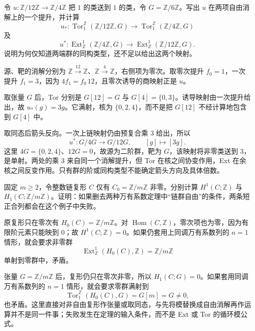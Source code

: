 \BookExercises

\begin{exercise}\label{g2:ex:cyclic-coefficient-maps}
	令 \(u:\mathbb Z/12\mathbb Z\to\mathbb Z/4\mathbb Z\) 把 \(1\) 的类送到 \(1\) 的类，令 \(G=\mathbb Z/6\mathbb Z\)。写出 \(u\) 在两项自由消解上的一个提升，并计算
	\[
		u_*:\operatorname{Tor}^{\mathbb Z}_1(\mathbb Z/12\mathbb Z,G)\longrightarrow\operatorname{Tor}^{\mathbb Z}_1(\mathbb Z/4\mathbb Z,G)
	\]
	及
	\[
		u^*:\operatorname{Ext}_{\mathbb Z}^1(\mathbb Z/4\mathbb Z,G)\longrightarrow\operatorname{Ext}_{\mathbb Z}^1(\mathbb Z/12\mathbb Z,G).
	\]
	说明为何仅知道两端群的同构类型，还不足以给出这两个映射。
\end{exercise}
\begin{solution}
	源、靶的消解分别为 \(\mathbb Z\xrightarrow{12}\mathbb Z\)、\(\mathbb Z\xrightarrow{4}\mathbb Z\)，右侧项为零次。取零次提升 \(f_0=1\)，一次提升 \(f_1=3\)，因为 \(4f_1=f_0\,12\)，且零次诱导的商映射正是 \(u\)。

	取张量 \(G\) 后，Tor 分别是 \(G[12]=G\) 与 \(G[4]=\{0,3\}\)。诱导映射由一次提升给出，故 \(u_*(g)=3g\)。它满射，核为 \(\{0,2,4\}\)，而不是把 \(G[12]\) 不经计算地包含到 \(G[4]\) 中。

	取同态后箭头反向。一次上链映射仍由预复合乘 \(3\) 给出，所以
	\[
		u^*:G/4G\longrightarrow G/12G,\qquad[g]\longmapsto[3g].
	\]
	这里 \(4G=\{0,2,4\}\)、\(12G=0\)，故源为二阶群，靶为 \(G\)，该映射将非零类送到 \(3\)，是单射。两处的乘 \(3\) 来自同一个消解提升，但 Tor 在核之间协变作用，Ext 在余核之间反变作用。只有群的阶或同构类型不能确定箭头方向及具体倍数。
\end{solution}

\begin{exercise}\label{g2:ex:uct-needs-free-chains}
	固定 \(m\ge2\)，令整数链复形 \(C\) 仅有 \(C_0=\mathbb Z/m\mathbb Z\) 非零。分别计算 \(H^1(C;\mathbb Z)\) 与 \(H_1(C;\mathbb Z/m\mathbb Z)\)。证明：如果删去两种万有系数定理中“链群自由”的条件，两条短正合列都会在这个例子中失败。
\end{exercise}
\begin{solution}
	原复形只在零次有 \(H_0(C)=\mathbb Z/m\mathbb Z\)。对 \(\operatorname{Hom}(C,\mathbb Z)\)，零次项也为零，因为有限阶元素只能映到 \(0\)；故 \(H^1(C;\mathbb Z)=0\)。如果仍套用上同调万有系数列的 \(n=1\) 情形，就会要求非零群
	\[
		\operatorname{Ext}_{\mathbb Z}^1(H_0(C),\mathbb Z)=\mathbb Z/m\mathbb Z
	\]
	单射到零群中，矛盾。

	张量 \(G=\mathbb Z/m\mathbb Z\) 后，复形仍只在零次非零，所以 \(H_1(C;G)=0\)。如果套用同调万有系数列的 \(n=1\) 情形，就会要求零群满射到
	\[
		\operatorname{Tor}^{\mathbb Z}_1(H_0(C),G)=G[m]=G\ne0,
	\]
	也矛盾。这里直接对非自由复形作张量或取同态，与先将模替换成自由消解再作运算并不是同一件事；失败发生在定理的输入条件，而不是 Ext 或 Tor 的循环模公式。
\end{solution}

